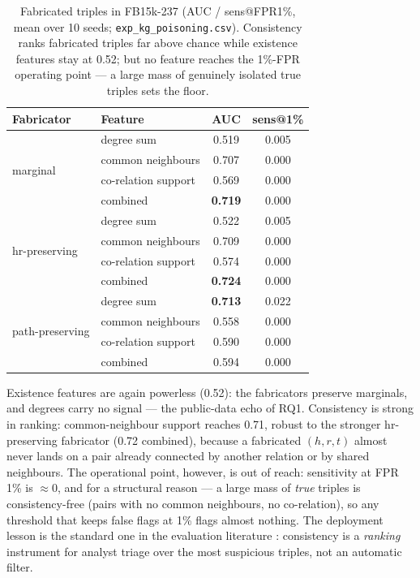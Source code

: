\documentclass[conference]{IEEEtran}
\begin{document}
\begin{table}[t]\centering\footnotesize
\caption{Fabricated triples in FB15k-237 (AUC / sens@FPR1\%, mean over 10
seeds; \texttt{exp\_kg\_poisoning.csv}). Consistency ranks fabricated
triples far above chance while existence features stay at 0.52; but no
feature reaches the 1\%-FPR operating point --- a large mass of genuinely
isolated true triples sets the floor.}
\label{tab:kg}
\begin{tabular}{llcc}
\toprule
Fabricator & Feature & AUC & sens@1\% \\
\midrule
\multirow{4}{*}{marginal}
 & degree sum          & 0.519 & 0.005 \\
 & common neighbours   & 0.707 & 0.000 \\
 & co-relation support  & 0.569 & 0.000 \\
 & combined            & \textbf{0.719} & 0.000 \\
\midrule
\multirow{4}{*}{hr-preserving}
 & degree sum          & 0.522 & 0.005 \\
 & common neighbours   & 0.709 & 0.000 \\
 & co-relation support & 0.574 & 0.000 \\
 & combined            & \textbf{0.724} & 0.000 \\
\midrule
\multirow{4}{*}{path-preserving}
 & degree sum          & \textbf{0.713} & 0.022 \\
 & common neighbours   & 0.558 & 0.000 \\
 & co-relation support & 0.590 & 0.000 \\
 & combined            & 0.594 & 0.000 \\
\bottomrule
\end{tabular}
\end{table}

Existence features are again powerless (0.52): the fabricators preserve
marginals, and degrees carry no signal --- the public-data echo of RQ1.
Consistency is strong in ranking: common-neighbour support reaches 0.71,
robust to the stronger hr-preserving fabricator (0.72 combined), because a
fabricated $(h,r,t)$ almost never lands on a pair already connected by
another relation or by shared neighbours. The operational point, however,
is out of reach: sensitivity at FPR 1\% is $\approx$0, and for a structural
reason --- a large mass of \emph{true} triples is consistency-free (pairs
with no common neighbours, no co-relation), so any threshold that keeps
false flags at 1\% flags almost nothing. The deployment lesson is the
standard one in the evaluation literature
\cite{arp2022dos,pendlebury2019tesseract}: consistency is a
\emph{ranking} instrument for analyst triage over the most suspicious
triples, not an automatic filter.
\end{document}

